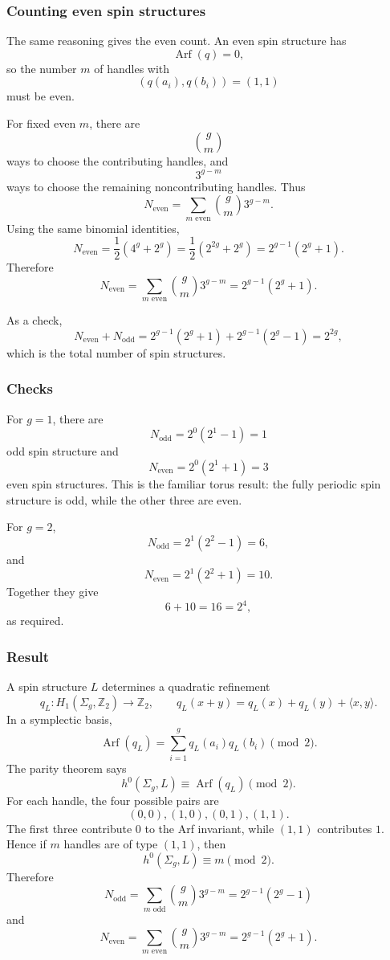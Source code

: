 \documentclass[
  10pt,
  a4paper,
  openany]{book}
\begin{document}
\subsubsection{Counting even spin
structures}\label{counting-even-spin-structures}

The same reasoning gives the even count. An even spin structure has \[
\operatorname{Arf}(q)=0,
\] so the number \(m\) of handles with \[
\left(q(a_i),q(b_i)\right)=(1,1)
\] must be even.

For fixed even \(m\), there are \[
\binom{g}{m}
\] ways to choose the contributing handles, and \[
3^{g-m}
\] ways to choose the remaining noncontributing handles. Thus \[
N_{\text{even}}
=
\sum_{m\text{ even}}\binom{g}{m}3^{g-m}.
\] Using the same binomial identities, \[
N_{\text{even}}
=
\frac{1}{2}\left(4^g+2^g\right)
=
\frac{1}{2}\left(2^{2g}+2^g\right)
=
2^{g-1}(2^g+1).
\] Therefore \[
\boxed{
N_{\text{even}}
=
\sum_{m\text{ even}}\binom{g}{m}3^{g-m}
=
2^{g-1}(2^g+1).
}
\]

As a check, \[
N_{\text{even}}+N_{\text{odd}}
=
2^{g-1}(2^g+1)+2^{g-1}(2^g-1)
=
2^{2g},
\] which is the total number of spin structures.

\subsubsection{Checks}\label{checks-1}

For \(g=1\), there are \[
N_{\text{odd}}
=
2^{0}(2^1-1)
=
1
\] odd spin structure and \[
N_{\text{even}}
=
2^{0}(2^1+1)
=
3
\] even spin structures. This is the familiar torus result: the fully
periodic spin structure is odd, while the other three are even.

For \(g=2\), \[
N_{\text{odd}}
=
2^{1}(2^2-1)
=
6,
\] and \[
N_{\text{even}}
=
2^{1}(2^2+1)
=
10.
\] Together they give \[
6+10=16=2^{4},
\] as required.

\subsubsection{Result}\label{result-5}

A spin structure \(L\) determines a quadratic refinement \[
q_L:H_1(\Sigma_g,\mathbb Z_2)\to\mathbb Z_2,
\qquad
q_L(x+y)=q_L(x)+q_L(y)+\langle x,y\rangle.
\] In a symplectic basis, \[
\operatorname{Arf}(q_L)
=
\sum_{i=1}^g q_L(a_i)q_L(b_i)
\pmod 2.
\] The parity theorem says \[
h^0(\Sigma_g,L)
\equiv
\operatorname{Arf}(q_L)
\pmod 2.
\] For each handle, the four possible pairs are \[
(0,0),(1,0),(0,1),(1,1).
\] The first three contribute \(0\) to the Arf invariant, while
\((1,1)\) contributes \(1\). Hence if \(m\) handles are of type
\((1,1)\), then \[
h^0(\Sigma_g,L)\equiv m\pmod 2.
\] Therefore \[
\boxed{
N_{\text{odd}}
=
\sum_{m\text{ odd}}\binom{g}{m}3^{g-m}
=
2^{g-1}(2^g-1)
}
\] and \[
\boxed{
N_{\text{even}}
=
\sum_{m\text{ even}}\binom{g}{m}3^{g-m}
=
2^{g-1}(2^g+1).
}
\]
\end{document}

